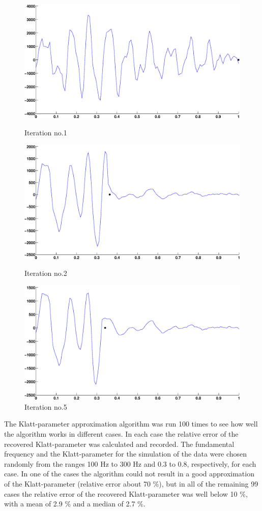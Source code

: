 \documentclass[12pt,a4]{article}
\begin{document}
\begin{figure}[H]
\begin{center}
 \includegraphics[scale=.35]{img/Approx_iter_onePer-v3-1.eps}
 \caption{Iteration no.1}
 \includegraphics[scale=.35]{img/Approx_iter_onePer-v3-2.eps}
 \caption{Iteration no.2}
 \includegraphics[scale=.35]{img/Approx_iter_onePer-v3-3.eps}
 \caption{Iteration no.5}\label{fig:app3-end}
\end{center}
\end{figure}

The Klatt-parameter approximation algorithm was run 100 times to see how well the algorithm works in different cases. In each case the relative error of the recovered Klatt-parameter was calculated and recorded. The fundamental frequency and the Klatt-parameter for the simulation of the data were chosen randomly from the ranges 100 Hz to 300 Hz and 0.3 to 0.8, respectively, for each case. In one of the cases the algorithm could not result in a good approximation of the Klatt-parameter (relative error about 70 \%), but in all of the remaining 99 cases the relative error of the recovered Klatt-parameter was well below 10 \%, with a mean of 2.9 \% and a median of 2.7 \%.
\end{document}
